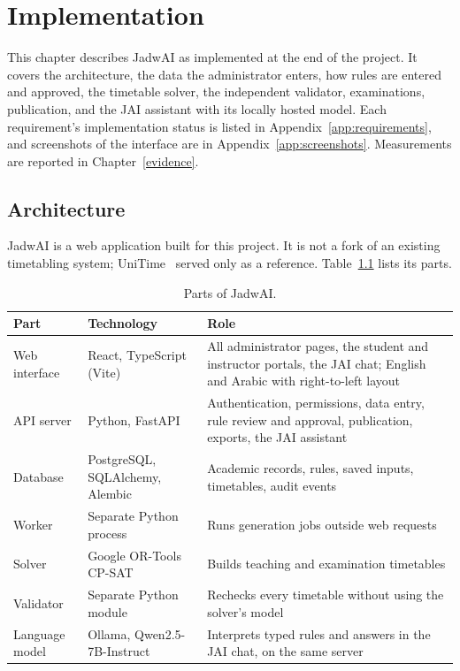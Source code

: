 \chapter{Implementation}\label{chap:implementation}


This chapter describes JadwAI as implemented at the end of the project. It covers the architecture, the data the administrator enters, how rules are entered and approved, the timetable solver, the independent validator, examinations, publication, and the JAI assistant with its locally hosted model. Each requirement's implementation status is listed in Appendix~\ref{app:requirements}, and screenshots of the interface are in Appendix~\ref{app:screenshots}. Measurements are reported in Chapter~\ref{evidence}.

\section{Architecture}\label{implementation-status}

JadwAI is a web application built for this project. It is not a fork of an existing timetabling system; UniTime~\cite{muller2025itc} served only as a reference. Table~\ref{tab:architecture} lists its parts.

\begin{table}[h]
\centering
\small
\begin{tabular}{@{}p{}p{}p{}@{}}
\toprule
Part & Technology & Role \\
\midrule
Web interface & React, TypeScript (Vite) & All administrator pages, the student and instructor portals, the JAI chat; English and Arabic with right-to-left layout \\
API server & Python, FastAPI & Authentication, permissions, data entry, rule review and approval, publication, exports, the JAI assistant \\
Database & PostgreSQL, SQLAlchemy, Alembic & Academic records, rules, saved inputs, timetables, audit events \\
Worker & Separate Python process & Runs generation jobs outside web requests \\
Solver & Google OR-Tools CP-SAT~\cite{google_cpsat} & Builds teaching and examination timetables \\
Validator & Separate Python module & Rechecks every timetable without using the solver's model \\
Language model & Ollama, Qwen2.5-7B-Instruct & Interprets typed rules and answers in the JAI chat, on the same server \\
\bottomrule
\end{tabular}
\caption{Parts of JadwAI.}
\label{tab:architecture}
\end{table}

